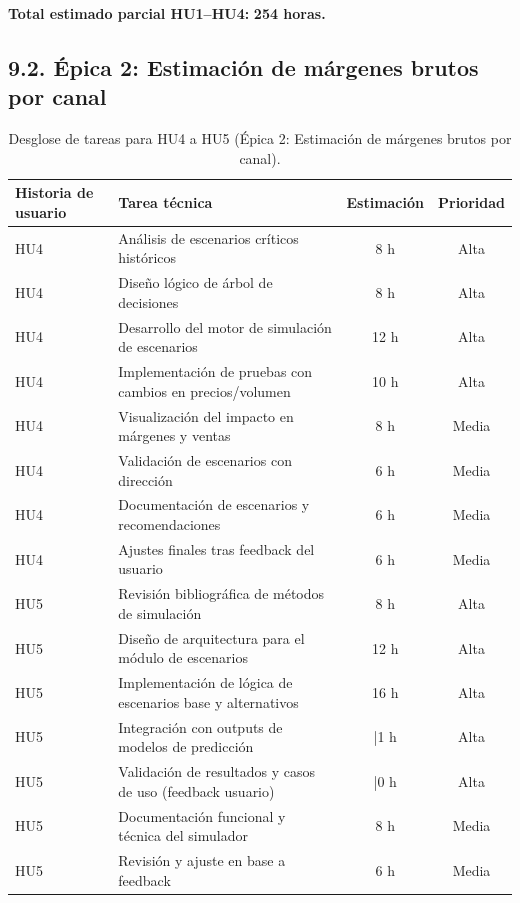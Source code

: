 \documentclass[
11pt, %
]{charter}
\begin{document}
\vspace{0.5cm}
\noindent
\textbf{Total estimado parcial HU1–HU4:} \textbf{254 horas.}

\subsection*{9.2. Épica 2: Estimación de márgenes brutos por canal}

\begin{table}[H]
\centering
\begin{tabular}{|l|p{6cm}|c|c|}
\hline
\textbf{Historia de usuario} & \textbf{Tarea técnica} & \textbf{Estimación} & \textbf{Prioridad} \\
\hline
HU4 & Análisis de escenarios críticos históricos & 8 h & Alta \\
HU4 & Diseño lógico de árbol de decisiones & 8 h & Alta \\
HU4 & Desarrollo del motor de simulación de escenarios & 12 h & Alta \\
HU4 & Implementación de pruebas con cambios en precios/volumen & 10 h & Alta \\
HU4 & Visualización del impacto en márgenes y ventas & 8 h & Media \\
HU4 & Validación de escenarios con dirección & 6 h & Media \\
HU4 & Documentación de escenarios y recomendaciones & 6 h & Media \\
HU4 & Ajustes finales tras feedback del usuario & 6 h & Media \\
\hline
HU5 & Revisión bibliográfica de métodos de simulación & 8 h & Alta \\
HU5 & Diseño de arquitectura para el módulo de escenarios & 12 h & Alta \\
HU5 & Implementación de lógica de escenarios base y alternativos & 16 h & Alta \\
HU5 & Integración con outputs de modelos de predicción & |1 h & Alta \\
HU5 & Validación de resultados y casos de uso (feedback usuario) & |0 h & Alta \\
HU5 & Documentación funcional y técnica del simulador & 8 h & Media \\
HU5 & Revisión y ajuste en base a feedback & 6 h & Media \\
\hline
\end{tabular}
\caption{Desglose de tareas para HU4 a HU5 (Épica 2: Estimación de márgenes brutos por canal).}
\end{table}
\end{document}
